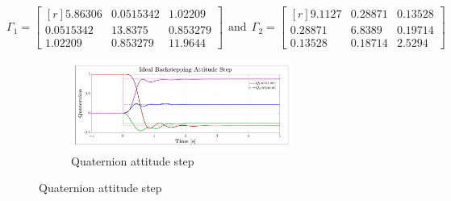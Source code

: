 \begin{equation}\label{eq:optimized-IBC}
\Gamma_1 = \begin{bmatrix*}[r]
5.86306 & 0.0515342 & 1.02209\\
0.0515342 & 13.8375 & 0.853279\\
1.02209 & 0.853279 & 11.9644
\end{bmatrix*}
~~\text{and}~~
\Gamma_2 = \begin{bmatrix*}[r]
9.1127 & 0.28871 & 0.13528\\
0.28871 & 6.8389 & 0.19714\\
0.13528 & 0.18714 & 2.5294
\end{bmatrix*}
\end{equation}
\begin{figure}[hbtp]
\vspace{-20pt}
\centering
\begin{subfigure}{\textwidth}
\centering
\includegraphics[width=0.8\textwidth]{graphs/IBC_Step}
\vspace{-10pt}
\caption{Quaternion attitude step}
\label{fig:IBC_Step}
\end{subfigure}
\vspace{-20pt}
\end{figure}
\newpage
